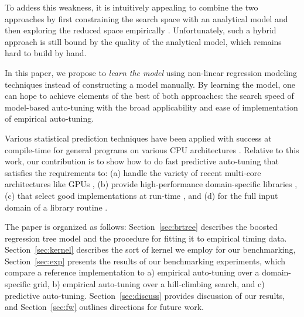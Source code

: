 \documentclass{sig-alternate}
\begin{document}
To addess this weakness, it is intuitively appealing to combine the two
approaches by first constraining the search space with an analytical model and
then exploring the reduced space empirically \citep{chen2005combining,
li2009note}. Unfortunately, such a hybrid approach is still bound by the quality
of the analytical model, which remains hard to build by hand.


In this paper, we propose to \emph{learn the model} using non-linear regression
modeling techniques instead of constructing a model manually. By learning the model, one can
hope to achieve elements of the best of both approaches: the search speed of model-based auto-tuning with the broad applicability
and ease of implementation of empirical auto-tuning.

Various statistical prediction techniques have been applied with
success at compile-time for general programs on various CPU architectures
\citep{monsifrot2002machine, stephenson2003meta, yotov2003comparison,
kulkarni2004fast, cooper2005acme, franke2005probabilistic,
hutter2006performance, cavazos2007rapidly, cavazos2008intelligent,
hartono2009annotation, park2011evaluation, fursin2008milepost}.
Relative to this work, our contribution is to show
how to do fast predictive auto-tuning that satisfies the requirements to:
(a) handle the variety of recent multi-core architectures like GPUs \citep{schaa2009exploring},
(b) provide high-performance domain-specific libraries \citep{nukada2009auto, li2009note, kamil2010auto},
(c) that select good implementations at run-time \citep{klockner2011pycuda, pinto+cox:2011gcg}, and
(d) for the full input domain of a library routine \citep{liu2009cross, grauer2011optimizing}.


The paper is organized as follows:
Section~\ref{sec:brtree} describes the boosted regression tree model and the procedure for fitting it to empirical timing data.
Section~\ref{sec:kernel} describes the sort of kernel we employ for our benchmarking,
Section~\ref{sec:exp} presents the results of our benchmarking experiments, which
compare a reference implementation to a) empirical auto-tuning over a domain-specific grid,
b) empirical auto-tuning over a hill-climbing search, and
c) predictive auto-tuning.
Section~\ref{sec:discuss} provides discussion of our results, and
Section~\ref{sec:fw} outlines directions for future work.
\end{document}
